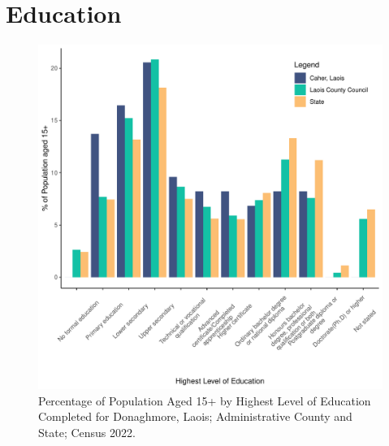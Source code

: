 \documentclass{article}
\begin{document}
\section{Education}\label{sect:Edu}
\begin{figure}[H]
	\centering
	\includegraphics[width = 120mm]{../figures/EduED.pdf}
	\caption{Percentage of Population Aged 15+ by Highest Level of Education Completed for Donaghmore, Laois; Administrative County and State; Census 2022.}
	\label{fig:vbnv}
	\end{figure}
\end{document}
